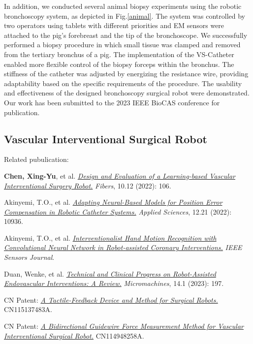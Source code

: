 \documentclass[
    ngerman,american
    ]{scrartcl}
\begin{document}
In addition, we conducted several animal biopsy experiments using the robotic bronchoscopy system, as depicted in Fig.\ref{animal}. The system was controlled by two operators using tablets with different priorities and EM sensors were attached to the pig's forebreast and the tip of the bronchoscope. We successfully performed a biopsy procedure in which small tissue was clamped and removed from the tertiary bronchus of a pig. The implementation of the VS-Catheter enabled more flexible control of the biopsy forceps within the bronchus. The stiffness of the catheter was adjusted by energizing the resistance wire, providing adaptability based on the specific requirements of the procedure. The usability and effectiveness of the designed bronchoscopy surgical robot were demonstrated. Our work has been submitted to the 2023 IEEE BioCAS conference for publication.








	\subsection{Vascular Interventional Surgical Robot}
Related pubulication: 	

\textbf{Chen, Xing-Yu}, et al. \href{https://doi.org/10.3390/fib10120106}{\textit{Design and Evaluation of a Learning-based Vascular Interventional Surgery Robot.}} \textit{Fibers}, 10.12 (2022): 106.

Akinyemi, T.O., et al.   \emph{\href{https://doi.org/10.3390/app122110936}{ Adapting Neural-Based Models for Position Error Compensation in Robotic Catheter Systems.}} \textit {Applied Sciences}, 12.21 (2022): 10936.

Akinyemi, T.O., et al.   \emph{\href{https://doi.org/10.1109/JSEN.2023.3281009}{Interventionalist Hand Motion Recognition with Convolutional Neural Network in Robot-assisted Coronary Interventions.}} \textit{IEEE Sensors Journal}.

Duan, Wenke, et al. \emph{\href{https://doi.org/10.3390/mi14010197}{Technical and Clinical Progress on Robot-Assisted Endovascular Interventions: A Review.}} \textit{Micromachines}, 14.1 (2023): 197.

CN Patent: \emph{\href{https://www.researchgate.net/publication/370801433_CN_Patent_yizhongshoushujiqirendezhuduanliganzhifankuicaozongzhuangzhijifangfa}{A Tactile-Feedback Device and Method for Surgical Robots.}} CN115137483A.


CN Patent: \emph{\href{https://www.researchgate.net/publication/370801270_CN_Patent_yizhongshuangxiangdianchushijierujiqirencongduandaosilijiancezhuangzhijifangfa}{ A Bidirectional Guidewire Force Measurement Method for Vascular Interventional Surgical Robot.}} CN114948258A.
~\\	
\end{document}
